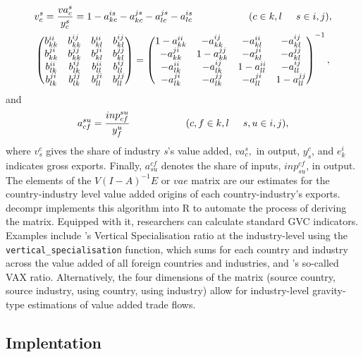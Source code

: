 \documentclass[a4paper]{article}\usepackage[]{graphicx}\usepackage[]{color}
\newcommand{\code}[1]{\texttt{#1}}
\begin{document}
\begin{align*}
 & v_{c}^{s}=\frac{va_{c}^{s}}{y_{c}^{s}}=1-a_{kc}^{is}-a_{kc}^{js}-a_{lc}^{js}-a_{lc}^{is}\hspace{2cm}(c\in k,l\hspace{0.5cm}s\in i,j),\\
 & \begin{pmatrix}b_{kk}^{ii} & b_{kk}^{ij} & b_{kl}^{ii} & b_{kl}^{ij}\\
b_{kk}^{ji} & b_{kk}^{jj} & b_{kl}^{ji} & b_{kl}^{jj}\\
b_{lk}^{ii} & b_{lk}^{ij} & b_{ll}^{ii} & b_{ll}^{ij}\\
b_{lk}^{ji} & b_{lk}^{jj} & b_{ll}^{ji} & b_{ll}^{jj}
\end{pmatrix}=\begin{pmatrix}1-a_{kk}^{ii} & -a_{kk}^{ij} & -a_{kl}^{ii} & -a_{kl}^{ij}\\
-a_{kk}^{ji} & 1-a_{kk}^{jj} & -a_{kl}^{ji} & -a_{kl}^{jj}\\
-a_{lk}^{ii} & -a_{lk}^{ij} & 1-a_{ll}^{ii} & -a_{ll}^{ij}\\
-a_{lk}^{ji} & -a_{lk}^{jj} & -a_{ll}^{ji} & 1-a_{ll}^{jj}
\end{pmatrix}^{-1},
\end{align*}
and 
\[
a_{cf}^{su}=\frac{inp_{cf}^{su}}{y_{f}^{u}}\hspace{2cm}(c,f\in k,l\hspace{0.5cm}s,u\in i,j),
\]
where $v_{s}^{c}$ gives the share of industry \emph{s}'s value added,
$va_{c}^{s},$ in output, $y_{s}^{c}$, and $e_{k}^{i}$ indicates
gross exports. Finally, $a_{su}^{cf}$ denotes the share of inputs,
$inp_{su}^{cf}$, in output. The elements of the $V(I-A)^{-1}E$ or
$vae$ matrix are our estimates for the country-industry level value
added origins of each country-industry's exports. decompr implements
this algorithm into R to automate the process of deriving the matrix.
Equipped with it, researchers can calculate standard GVC indicators.
Examples include \citet{dahuetal01}'s Vertical Specialisation ratio
at the industry-level using the \code{vertical\_specialisation} function,
which sums for each country and industry across the value added of
all foreign countries and industries, and \citet{rojoguno12}'s so-called
VAX ratio. Alternatively, the four dimensions of the matrix (source
country, source industry, using country, using industry) allow for
industry-level gravity-type estimations of value added trade flows.

\subsection{Implentation}
\end{document}

